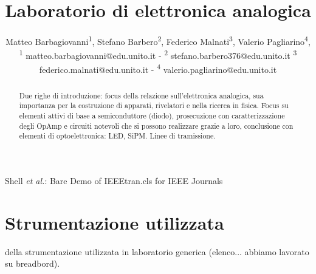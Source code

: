 \documentclass[journal]{IEEEtran}
\begin{document}
\title{Laboratorio di elettronica analogica\\ 
}

\author{\begin{center}Matteo Barbagiovanni\textsuperscript{1},
        Stefano Barbero\textsuperscript{2},
        Federico Malnati\textsuperscript{3},
        Valerio Pagliarino\textsuperscript{4},
        {\small \\
        \textsuperscript{1}
        matteo.barbagiovanni@edu.unito.it -
        \textsuperscript{2}
        stefano.barbero376@edu.unito.it
        \textsuperscript{3}
        federico.malnati@edu.unito.it -
        \textsuperscript{4}
        valerio.pagliarino@edu.unito.it}
        \end{center}}%
        
{Shell \MakeLowercase{\textit{et al.}}: Bare Demo of IEEEtran.cls for IEEE Journals}

\maketitle

\begin{abstract}  
Due righe di introduzione: focus della relazione sull'elettronica analogica, sua importanza per la costruzione di apparati, rivelatori e nella ricerca in fisica. Focus su elementi attivi di base a semiconduttore (diodo), prosecuzione con caratterizzazione degli OpAmp e circuiti notevoli che si possono realizzare grazie a loro, conclusione con elementi di optoelettronica: LED, SiPM. Linee di tramissione.
\end{abstract}


\section{Strumentazione utilizzata} %

 della strumentazione utilizzata in laboratorio generica (elenco... abbiamo lavorato su breadbord).
\end{document}
